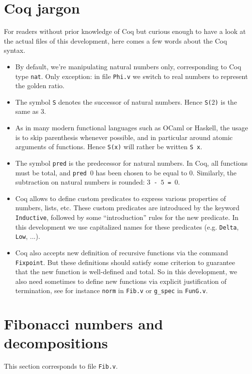 \documentclass[a4paper,11pt]{article}
\begin{document}
\section{Coq jargon}
For readers without prior knowledge
of Coq but curious enough to have a look at the actual files
of this development, here comes a few words about the Coq syntax.
\begin{itemize}
\item By default, we're manipulating natural numbers only, corresponding
 to Coq type {\tt nat}. Only exception: in file {\tt Phi.v}
 we switch to real numbers to represent the golden ratio.
\item The symbol {\tt S} denotes the successor of natural numbers.
  Hence {\tt S($2$)} is the same as $3$.
\item As in many modern functional languages such as OCaml or Haskell,
  the usage is to skip parenthesis whenever possible, and
  in particular around atomic arguments of functions. Hence
  {\tt S(x)} will rather be written {\tt S x}.
\item The symbol {\tt pred} is the predecessor for natural numbers.
  In Coq, all functions must be total, and {\tt pred $0$} has been
  chosen to be equal to $0$. Similarly, the subtraction on
  natural numbers is rounded: {\tt $3$ - $5$ = $0$}.
\item Coq allows to define custom predicates to express various
  properties of numbers, lists, etc. These custom predicates are
  introduced by the keyword {\tt Inductive}, followed by some
  ``introduction'' rules for the new predicate. In this development
  we use capitalized names for these predicates (e.g. {\tt Delta},
  {\tt Low}, ...).
\item Coq also accepts new definition of recursive functions via
  the command {\tt Fixpoint}. But these definitions should satisfy
  some criterion to guarantee that the new function is well-defined
  and total. So in this development, we also need sometimes to
  define new functions via explicit justification of termination,
  see for instance {\tt norm} in {\tt Fib.v} or {\tt g\_spec} in {\tt FunG.v}.
\end{itemize}

\section{Fibonacci numbers and decompositions}

This section corresponds to file {\tt Fib.v}.
\end{document}
